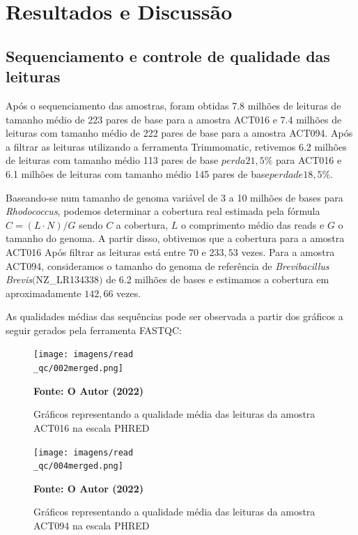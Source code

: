 \chapter{Resultados e Discussão}\label{cap:resultados}

\section{Sequenciamento e controle de qualidade das leituras}
Após o sequenciamento das amostras, foram obtidas 7.8 milhões de leituras de tamanho médio de 
223 pares de base para a amostra ACT016 e 7.4 milhões de leituras com tamanho médio de 222 pares de base
para a amostra ACT094. Após a filtrar as leituras utilizando a ferramenta Trimmomatic, retivemos
6.2 milhões de leituras com tamanho médio 113 pares de base \(perda 21,5\%\) para ACT016 e 6.1 milhões
de leituras com tamanho médio 145 pares de base\(perda de 18,5\%\).

Baseando-se num tamanho de genoma variável de 3 a 10 milhões de bases para \textit{Rhodococcus}, podemos
determinar a cobertura real estimada pela fórmula $C= (L\cdot N)/G $ sendo $C$ a cobertura, $L$ o comprimento
médio das reads e $G$ o tamanho do genoma. A partir disso, obtivemos que a cobertura para a amostra ACT016 Após
filtrar as leituras está entre $70$ e $233,53$ vezes. 
Para a amostra ACT094, consideramos o tamanho do genoma de referência de \textit{Brevibacillus Brevis}$($NZ\_LR134338$)$ 
de 6.2 milhões de bases e estimamos a cobertura em aproximadamente $142,66$ vezes.

As qualidades médias das sequências pode ser observada a partir dos gráficos a seguir gerados pela ferramenta FASTQC:

\begin{figure}[H]
	\caption{Gráficos representando a qualidade média das leituras da amostra ACT016 na escala PHRED}
	\centering
	\texttt{[image: imagens/read\\\_qc/002merged.png]} \\
	\centering
    \begin{small}\textbf{Fonte: O Autor (2022)}\end{small}
\end{figure}
\vspace{\floatsep}
\begin{figure}[H]
	\caption{Gráficos representando a qualidade média das leituras da amostra ACT094 na escala PHRED}
	\centering
	\texttt{[image: imagens/read\\\_qc/004merged.png]} \\
	\centering
    \begin{small}\textbf{Fonte: O Autor (2022)}\end{small}
\end{figure}
\vspace{\floatsep}

